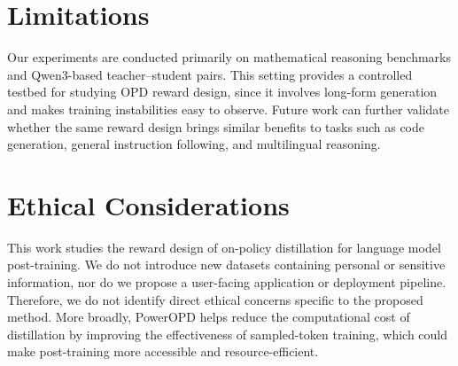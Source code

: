 \section*{Limitations}

Our experiments are conducted primarily on mathematical reasoning benchmarks and Qwen3-based teacher–student pairs. This setting provides a controlled testbed for studying OPD reward design, since it involves long-form generation and makes training instabilities easy to observe. Future work can further validate whether the same reward design brings similar benefits to tasks such as code generation, general instruction following, and multilingual reasoning.

\section*{Ethical Considerations}
This work studies the reward design of on-policy distillation for language model post-training. We do not introduce new datasets containing personal or sensitive information, nor do we propose a user-facing application or deployment pipeline. Therefore, we do not identify direct ethical concerns specific to the proposed method. More broadly, PowerOPD helps reduce the computational cost of distillation by improving the effectiveness of sampled-token training, which could make post-training more accessible and resource-efficient.


